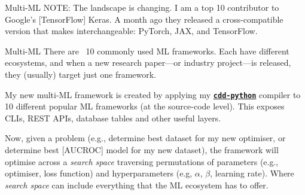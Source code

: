 \documentclass[aspectratio=169,xcolor=dvipsnames]{beamer}
\begin{document}
\begin{frame}{Multi-ML}
	NOTE: The landscape is changing. I am a top 10 contributor to Google's [TensorFlow] Keras. A month ago they released a cross-compatible version that makes interchangeable: PyTorch, JAX, and TensorFlow.
\end{frame}

\begin{frame}{Multi-ML}
	There are ~10 commonly used ML frameworks. Each have different ecosystems, and when a new research paper---or industry project---is released, they (usually) target just one framework.\vspace{1em}

	My new multi-ML framework is created by applying my \href{https://pypi.org/project/python-cdd}{\texttt{\textbf{cdd-python}}} compiler to 10 different popular ML frameworks (at the source-code level). This exposes CLIs, REST APIs, database tables and other useful layers.\vspace{1em}

	Now, given a problem (e.g., determine best dataset for my new optimiser, or determine best [AUCROC] model for my new dataset), the framework will optimise across a \textit{search space} traversing permutations of parameters (e.g., optimiser, loss function) and hyperparameters (e.g, \(\alpha\), \(\beta\), learning rate). Where \textit{search space} can include everything that the ML ecosystem has to offer.
\end{frame}

{
\begin{frame}[plain]
\end{frame}
}
\end{document}
